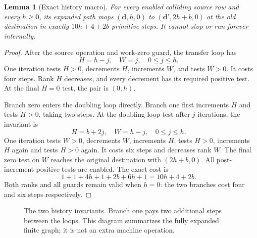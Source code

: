 \documentclass[11pt,a4paper]{article}
\numberwithin{equation}{section}
\newtheorem{lemma}[theorem]{Lemma}
\begin{document}
\begin{lemma}[Exact history macro]\label{fpa:ls:lem:history}
For every enabled colliding source row and every $h\ge0$, its expanded path
maps $(\mathbf d,h,0)$ to $(\mathbf d',2h+b,0)$ at the old destination in
exactly $10h+4+2b$ primitive steps. It cannot stop or run forever internally.
\end{lemma}
\begin{proof}
After the source operation and work-zero guard, the transfer loop has
\[
                   H=h-j,\quad W=j,\quad 0\le j\le h.   \tag{8}
\]
One iteration tests $H>0$, decrements $H$, increments $W$, and tests $W>0$.
It costs four steps. Rank $H$ decreases, and every decrement has its required
positive test. At the final $H=0$ test, the pair is $(0,h)$.

Branch zero enters the doubling loop directly. Branch one first increments
$H$ and tests $H>0$, taking two steps. At the doubling-loop test after $j$
iterations, the invariant is
\[
                   H=b+2j,\quad W=h-j,\quad 0\le j\le h.\tag{9}
\]
One iteration tests $W>0$, decrements $W$, increments $H$, tests $H>0$,
increments $H$ again and tests $H>0$ again. It costs six steps and decreases
rank $W$. The final zero test on $W$ reaches the original destination with
$(2h+b,0)$. All post-increment positive tests are enabled. The exact cost is
\[
            1+1+4h+1+2b+6h+1=10h+4+2b.                \tag{10}
\]
Both ranks and all guards remain valid when $h=0$: the two branches cost four
and six steps respectively.
\end{proof}

\begin{figure}[ht]
\centering
{}
\caption{The two history invariants. Branch one pays two additional steps
between the loops. This diagram summarizes the fully expanded finite graph;
it is not an extra machine operation.}
\label{fpa:ls:fig:history}
\end{figure}
\end{document}
